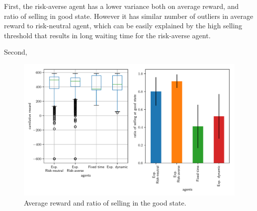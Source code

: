 First, the risk-averse agent has a lower variance both on average reward, and ratio of selling in good state. However it has similar number of outliers in average reward to risk-neutral agent, which can be easily explained by the high selling threshold that results in long waiting time for the risk-averse agent.

Second, %

\begin{figure}[h]
    \centering
    \includegraphics[width=0.99\linewidth]{img/performance.pdf}
    \caption{Average reward and ratio of selling in the good state.}\label{fig:perf}
\end{figure}
